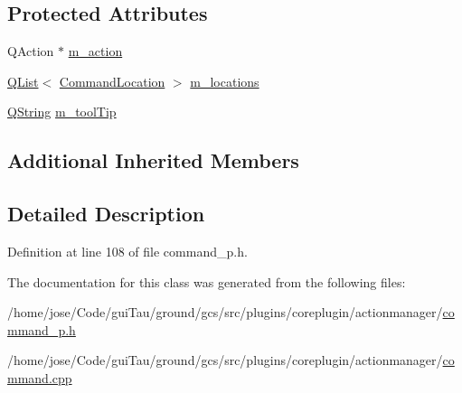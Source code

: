 \subsection*{Protected Attributes}
\begin{DoxyCompactItemize}
\item 
Q\-Action $\ast$ \hyperlink{group___core_plugin_ga827e65b079e2f8aee3efde2303268033}{m\-\_\-action}
\item 
\hyperlink{class_q_list}{Q\-List}$<$ \hyperlink{struct_command_location}{Command\-Location} $>$ \hyperlink{group___core_plugin_ga7eefc17da6c9cd4cfb8cd25d9e4f36f3}{m\-\_\-locations}
\item 
\hyperlink{group___u_a_v_objects_plugin_gab9d252f49c333c94a72f97ce3105a32d}{Q\-String} \hyperlink{group___core_plugin_gaf4ee67cdbac6ade0ff69cde9b002fd28}{m\-\_\-tool\-Tip}
\end{DoxyCompactItemize}
\subsection*{Additional Inherited Members}


\subsection{Detailed Description}


Definition at line 108 of file command\-\_\-p.\-h.



The documentation for this class was generated from the following files\-:\begin{DoxyCompactItemize}
\item 
/home/jose/\-Code/gui\-Tau/ground/gcs/src/plugins/coreplugin/actionmanager/\hyperlink{command__p_8h}{command\-\_\-p.\-h}\item 
/home/jose/\-Code/gui\-Tau/ground/gcs/src/plugins/coreplugin/actionmanager/\hyperlink{command_8cpp}{command.\-cpp}\end{DoxyCompactItemize}
